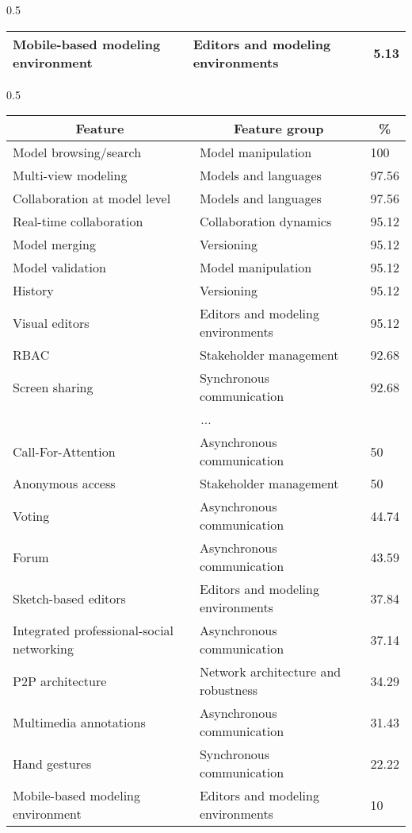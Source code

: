 \begin{table*}[]
\begin{subtable}[c]{0.5\textwidth}
\begin{tabular}{@{}lll@{}}
Mobile-based modeling environment & Editors and modeling environments & 5.13 \\ 
\bottomrule
  \end{tabular}%
  \end{subtable}
  \begin{subtable}[c]{0.5\textwidth}
  \centering
  \notsotiny
  \caption{Need.}
  \label{tab:top-bottom-need}
  \begin{tabular}{@{}lll@{}}
  \toprule
  \multicolumn{1}{c}{\textbf{Feature}} & \multicolumn{1}{c}{\textbf{Feature group}} & \multicolumn{1}{c}{\textbf{\%}} \\
  \midrule
  Model browsing/search & Model manipulation & 100 \\ 
Multi-view modeling & Models and languages & 97.56 \\ 
Collaboration at model level & Models and languages & 97.56 \\ 
Real-time collaboration & Collaboration dynamics & 95.12 \\ 
Model merging & Versioning & 95.12 \\ 
Model validation & Model manipulation & 95.12 \\ 
History & Versioning & 95.12 \\ 
Visual editors & Editors and modeling environments & 95.12 \\ 
RBAC & Stakeholder management & 92.68 \\ 
Screen sharing & Synchronous communication & 92.68 \\ 
\multicolumn{3}{c}{...} \\ 
Call-For-Attention & Asynchronous communication & 50 \\ 
Anonymous access & Stakeholder management & 50 \\ 
Voting & Asynchronous communication & 44.74 \\ 
Forum & Asynchronous communication & 43.59 \\ 
Sketch-based editors & Editors and modeling environments & 37.84 \\ 
Integrated professional-social networking & Asynchronous communication & 37.14 \\ 
P2P architecture & Network architecture and robustness & 34.29 \\ 
Multimedia annotations & Asynchronous communication & 31.43 \\ 
Hand gestures & Synchronous communication & 22.22 \\ 
Mobile-based modeling environment & Editors and modeling environments & 10 \\ 
\bottomrule
  \end{tabular}
  \end{subtable}
  \end{table*}